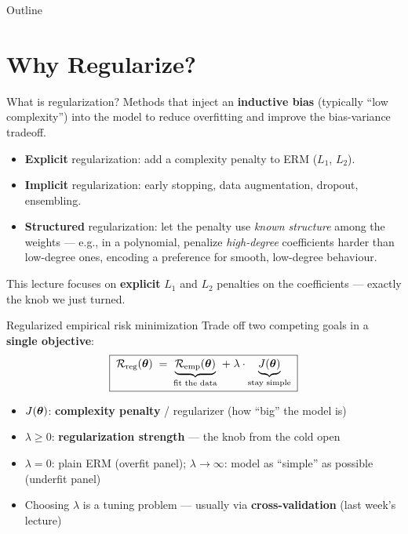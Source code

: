 \documentclass[aspectratio=169]{beamer}
\begin{document}
\begin{frame}{Outline}
  \tableofcontents
\end{frame}

\section{Why Regularize?}

\begin{frame}{What is regularization?}
  Methods that inject an \textbf{inductive bias} (typically ``low complexity'') into the model to reduce overfitting and improve the bias-variance tradeoff.
  \vfill
  \begin{itemize}
    \item \textbf{Explicit} regularization: add a complexity penalty to ERM ($L_1$, $L_2$).
    \item \textbf{Implicit} regularization: early stopping, data augmentation, dropout, ensembling.
    \item \textbf{Structured} regularization: let the penalty use \emph{known structure} among the weights --- e.g., in a polynomial, penalize \emph{high-degree} coefficients harder than low-degree ones, encoding a preference for smooth, low-degree behaviour.
  \end{itemize}
  \vfill
  This lecture focuses on \textbf{explicit} $L_1$ and $L_2$ penalties on the coefficients --- exactly the knob we just turned.
\end{frame}

\begin{frame}{Regularized empirical risk minimization}
  Trade off two competing goals in a \textbf{single objective}:
  \[
    \boxed{\;\mathcal{R}_{\text{reg}}(\bm{\theta}) \;=\; \underbrace{\mathcal{R}_{\text{emp}}(\bm{\theta})}_{\text{fit the data}} \;+\; \lambda \cdot \underbrace{J(\bm{\theta})}_{\text{stay simple}}\;}
  \]
  \begin{itemize}\small
    \item $J(\bm{\theta})$: \textbf{complexity penalty} / regularizer (how ``big'' the model is)
    \item $\lambda \ge 0$: \textbf{regularization strength} --- the knob from the cold open
    \item $\lambda = 0$: plain ERM (overfit panel); \quad $\lambda \to \infty$: model as ``simple'' as possible (underfit panel)
    \item Choosing $\lambda$ is a tuning problem --- usually via \textbf{cross-validation} (last week's lecture)
  \end{itemize}
  \vfill
\end{frame}
\end{document}
